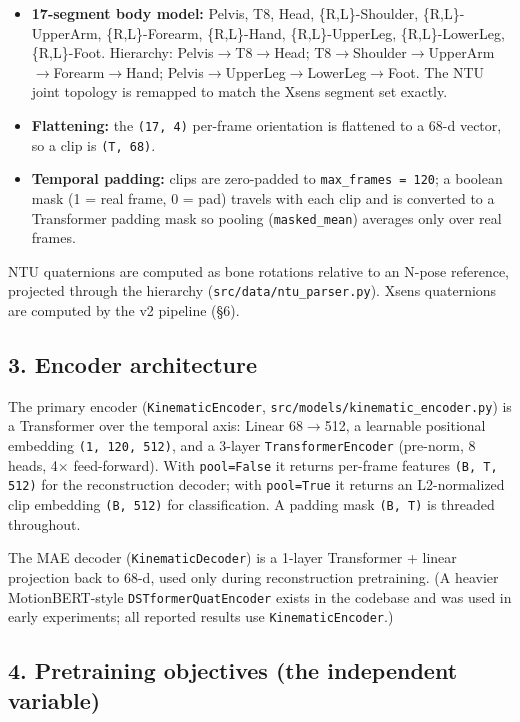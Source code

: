 \begin{itemize}
  \item \textbf{17-segment body model:} Pelvis, T8, Head, \{R,L\}-Shoulder, \{R,L\}-UpperArm, \{R,L\}-Forearm, \{R,L\}-Hand, \{R,L\}-UpperLeg, \{R,L\}-LowerLeg, \{R,L\}-Foot. Hierarchy: Pelvis$\rightarrow$T8$\rightarrow$Head; T8$\rightarrow$Shoulder$\rightarrow$UpperArm$\rightarrow$Forearm$\rightarrow$Hand; Pelvis$\rightarrow$UpperLeg$\rightarrow$LowerLeg$\rightarrow$Foot. The NTU joint topology is remapped to match the Xsens segment set exactly.
  \item \textbf{Flattening:} the \texttt{(17, 4)} per-frame orientation is flattened to a 68-d vector, so a clip is \texttt{(T, 68)}.
  \item \textbf{Temporal padding:} clips are zero-padded to \texttt{max\_frames = 120}; a boolean mask (1 = real frame, 0 = pad) travels with each clip and is converted to a Transformer padding mask so pooling (\texttt{masked\_mean}) averages only over real frames.
\end{itemize}

NTU quaternions are computed as bone rotations relative to an N-pose reference, projected through the hierarchy (\texttt{src/data/ntu\_parser.py}). Xsens quaternions are computed by the v2 pipeline (\S{}6).

\subsection{3. Encoder architecture}

The primary encoder (\texttt{KinematicEncoder}, \texttt{src/models/kinematic\_encoder.py}) is a Transformer over the temporal axis: Linear 68$\rightarrow$512, a learnable positional embedding \texttt{(1, 120, 512)}, and a 3-layer \texttt{TransformerEncoder} (pre-norm, 8 heads, 4$\times$ feed-forward). With \texttt{pool=False} it returns per-frame features \texttt{(B, T, 512)} for the reconstruction decoder; with \texttt{pool=True} it returns an L2-normalized clip embedding \texttt{(B, 512)} for classification. A padding mask \texttt{(B, T)} is threaded throughout.

The MAE decoder (\texttt{KinematicDecoder}) is a 1-layer Transformer + linear projection back to 68-d, used only during reconstruction pretraining. (A heavier MotionBERT-style \texttt{DSTformerQuatEncoder} exists in the codebase and was used in early experiments; all reported results use \texttt{KinematicEncoder}.)

\subsection{4. Pretraining objectives (the independent variable)}

